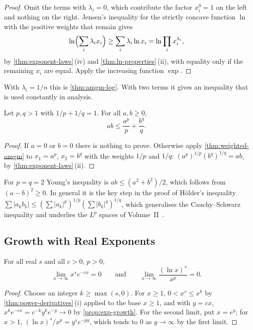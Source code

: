 \begin{proof}
Omit the terms with $\lambda_i=0$, which contribute the factor $x_i^0=1$ on the left and nothing on the right. Jensen's inequality for the strictly concave function $\ln$ with the positive weights that remain gives
\[
\ln\Bigl(\sum_i\lambda_ix_i\Bigr)\ge\sum_i\lambda_i\ln x_i=\ln\prod_ix_i^{\lambda_i},
\]
by \cref{thm:exponent-laws}\,(iv) and \cref{thm:ln-properties}\,(ii), with equality only if the remaining $x_i$ are equal. Apply the increasing function $\exp$.
\end{proof}

With $\lambda_i=1/n$ this is \cref{thm:amgm-log}. With two terms it gives an inequality that is used constantly in analysis.

\begin{corollary}
\label{cor:young}
Let $p,q>1$ with $1/p+1/q=1$. For all $a,b\ge0$,
\[
ab\le\frac{a^p}p+\frac{b^q}q .
\]
\end{corollary}

\begin{proof}
If $a=0$ or $b=0$ there is nothing to prove. Otherwise apply \cref{thm:weighted-amgm} to $x_1=a^p$, $x_2=b^q$ with the weights $1/p$ and $1/q$: $(a^p)^{1/p}(b^q)^{1/q}=ab$, by \cref{thm:exponent-laws}\,(ii).
\end{proof}

For $p=q=2$ Young's inequality is $ab\le(a^2+b^2)/2$, which follows from $(a-b)^2\ge0$. In general it is the key step in the proof of H\"older's inequality $\sum|a_kb_k|\le(\sum|a_k|^p)^{1/p}(\sum|b_k|^q)^{1/q}$, which generalises the Cauchy--Schwarz inequality and underlies the $L^p$ spaces of Volume~II~\cite{hardy1952inequalities}.

\subsection{Growth with Real Exponents}

\begin{proposition}
\label{prop:real-growth}
For all real $s$ and all $c>0$, $p>0$,
\[
\lim_{x\to\infty}x^se^{-cx}=0\qquad\text{and}\qquad\lim_{x\to\infty}\frac{(\ln x)^s}{x^p}=0 .
\]
\end{proposition}

\begin{proof}
Choose an integer $k\ge\max(s,0)$. For $x\ge1$, $0<x^s\le x^k$ by \cref{thm:power-derivatives}\,(i) applied to the base $x\ge1$, and with $y=cx$, $x^ke^{-cx}=c^{-k}y^ke^{-y}\to0$ by \cref{prop:exp-growth}. For the second limit, put $x=e^y$; for $x>1$, $(\ln x)^s/x^p=y^se^{-py}$, which tends to $0$ as $y\to\infty$ by the first limit.
\end{proof}

